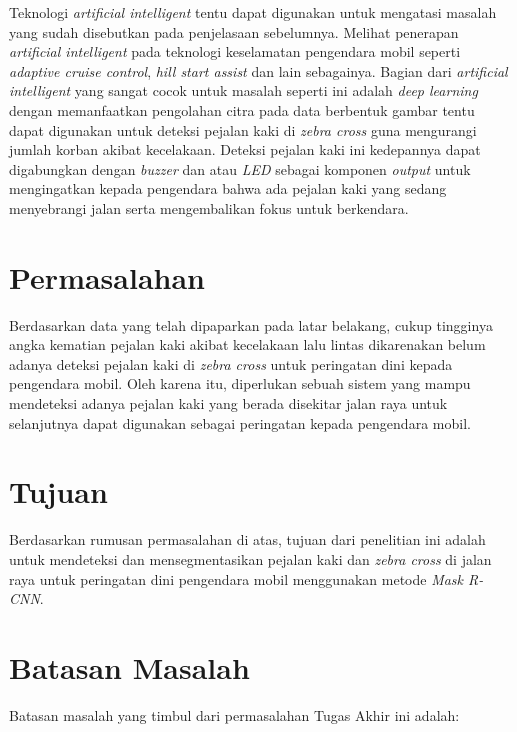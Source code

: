 Teknologi \textit{artificial intelligent} tentu dapat digunakan untuk mengatasi masalah yang sudah disebutkan pada penjelasaan sebelumnya. Melihat penerapan \textit{artificial intelligent} pada teknologi keselamatan pengendara mobil seperti \textit{adaptive cruise control}, \textit{hill start assist} dan lain sebagainya. Bagian dari \textit{artificial intelligent} yang sangat cocok untuk masalah seperti ini adalah \textit{deep learning} dengan memanfaatkan pengolahan citra pada data berbentuk gambar tentu dapat digunakan untuk deteksi pejalan kaki di \textit{zebra cross} guna mengurangi jumlah korban akibat kecelakaan. Deteksi pejalan kaki ini kedepannya dapat digabungkan dengan \textit{buzzer} dan atau \textit{LED} sebagai komponen \textit{output} untuk mengingatkan kepada pengendara bahwa ada pejalan kaki yang sedang menyebrangi jalan serta mengembalikan fokus untuk berkendara.

\section{Permasalahan}
\label{sec:permasalahan}

Berdasarkan data yang telah dipaparkan pada latar belakang, cukup tingginya angka kematian pejalan kaki akibat kecelakaan lalu lintas dikarenakan belum adanya deteksi pejalan kaki di \textit{zebra cross} untuk peringatan dini kepada pengendara mobil. Oleh karena itu, diperlukan sebuah sistem yang mampu mendeteksi adanya pejalan kaki yang berada disekitar jalan raya untuk selanjutnya dapat digunakan sebagai peringatan kepada pengendara mobil.

\section{Tujuan}
\label{sec:Tujuan}

Berdasarkan rumusan permasalahan di atas, tujuan dari penelitian ini adalah untuk mendeteksi dan mensegmentasikan pejalan kaki dan \textit{zebra cross} di jalan raya untuk peringatan dini pengendara mobil menggunakan metode \textit{Mask R-CNN}.



\section{Batasan Masalah}
\label{sec:batasanmasalah}

Batasan masalah yang timbul dari permasalahan Tugas Akhir ini adalah:

